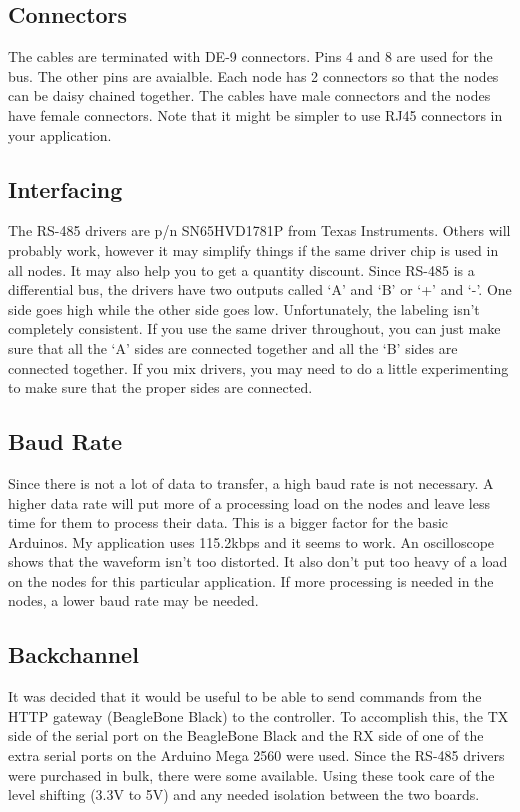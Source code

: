 \documentclass[10pt]{article}
\begin{document}
\subsection{Connectors}
The cables are terminated with DE-9 connectors.  Pins 4 and 8 are used for the bus.  The other pins are avaialble.  Each node has 2 connectors so that the nodes can be daisy chained together.  The cables have male connectors and the nodes have female connectors.  Note that it might be simpler to use RJ45 connectors in your application.

\subsection{Interfacing}
The RS-485 drivers are p/n SN65HVD1781P from Texas Instruments.  Others will probably work, however it may simplify things if the same driver chip is used in all nodes.  It may also help you to get a quantity discount.  Since RS-485 is a differential bus, the drivers have two outputs called `A' and `B' or `+' and `-'.  One side goes high while the other side goes low.  Unfortunately, the labeling isn't completely consistent.  If you use the same driver throughout, you can just make sure that all the `A' sides are connected together and all the `B' sides are connected together.  If you mix drivers, you may need to do a little experimenting to make sure that the proper sides are connected.


\subsection{Baud Rate}
Since there is not a lot of data to transfer, a high baud rate is not necessary.  A higher data rate will put more of a processing load on the nodes and leave less time for them to process their data.  This is a bigger factor for the basic Arduinos.  My application uses 115.2kbps and it seems to work.  An oscilloscope shows that the waveform isn't too distorted.  It also don't put too heavy of a load on the nodes for this particular application.  If more processing is needed in the nodes, a lower baud rate may be needed.

\subsection{Backchannel}
It was decided that it would be useful to be able to send commands from the HTTP gateway (BeagleBone Black) to the controller.  To accomplish this, the TX side of the serial port on the BeagleBone Black and the RX side of one of the extra serial ports on the Arduino Mega 2560 were used.  Since the RS-485 drivers were purchased in bulk, there were some available.  Using these took care of the level shifting (3.3V to 5V) and any needed isolation between the two boards.
\end{document}
